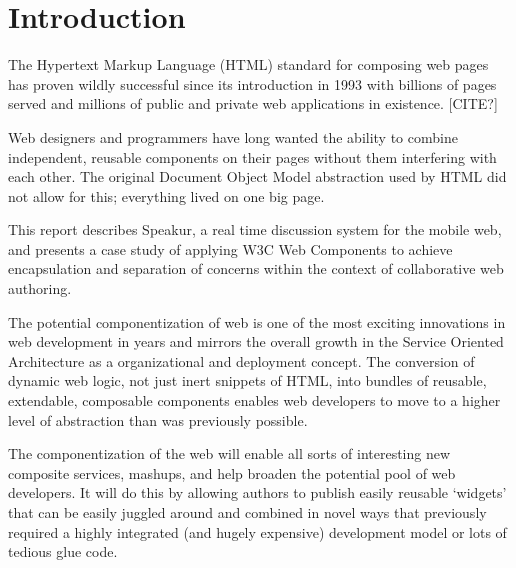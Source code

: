 \chapter{Introduction}
%

%
%

The Hypertext Markup Language (HTML) standard for composing web pages has proven wildly successful  since its introduction in 1993 with billions of pages served and millions of public and private web applications in existence. [CITE?]

Web designers and programmers have long wanted the ability to combine independent, reusable components on their pages without them interfering with each other. 
The original Document Object Model abstraction used by HTML did not allow for this; everything lived on one big page. 


This report describes Speakur, a real time discussion system for the mobile web, and 
presents a case study of applying W3C Web Components 
to achieve encapsulation and separation of concerns within the context of 
collaborative web authoring. 

The potential componentization of web is one of the most exciting innovations in web development in years and mirrors the overall growth in the Service Oriented Architecture 
as a organizational and deployment concept. 
The conversion of dynamic web logic, not just inert snippets of HTML, into bundles of reusable, extendable, composable components enables web developers to move to a higher level of abstraction than was previously possible.

The componentization of the web will enable all sorts of interesting new composite services, mashups, and help broaden the potential pool of web developers. 
It will do this by allowing authors to publish easily reusable `widgets' that can be easily juggled around and combined in novel ways that previously required a highly integrated (and hugely expensive) development model or lots of tedious glue code.

